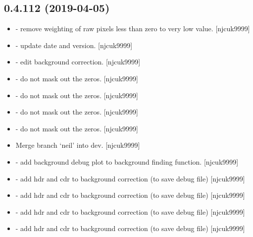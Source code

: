 \documentclass[a4paper,10pt,english]{report}
\begin{document}
\subsection{0.4.112 (2019-04-05)}
\label{\detokenize{misc/changelog:id149}}\begin{itemize}
\item {} 
 - remove weighting of raw pixels less than zero to very
low value. {[}njcuk9999{]}

\item {} 
 - update date and version. {[}njcuk9999{]}

\item {} 
 - edit background correction. {[}njcuk9999{]}

\item {} 
 - do not mask out the zeros. {[}njcuk9999{]}

\item {} 
 - do not mask out the zeros. {[}njcuk9999{]}

\item {} 
 - do not mask out the zeros. {[}njcuk9999{]}

\item {} 
 - do not mask out the zeros. {[}njcuk9999{]}

\item {} 
Merge branch ‘neil’ into dev. {[}njcuk9999{]}

\item {} 
 - add background debug plot to background finding
function. {[}njcuk9999{]}

\item {} 
 - add hdr and cdr to background correction (to save
debug file) {[}njcuk9999{]}

\item {} 
 - add hdr and cdr to background correction (to
save debug file) {[}njcuk9999{]}

\item {} 
 - add hdr and cdr to background correction
(to save debug file) {[}njcuk9999{]}

\item {} 
 - add hdr and cdr to background correction (to
save debug file) {[}njcuk9999{]}


\end{itemize}
\end{document}
